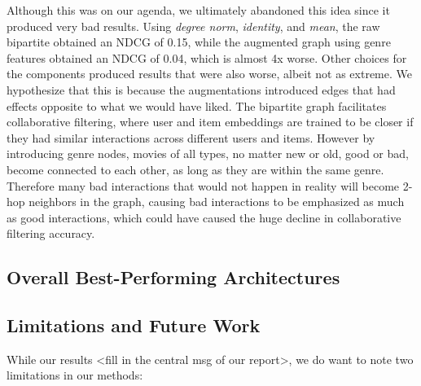 \documentclass{article}
\begin{document}
Although this was on our agenda, we ultimately abandoned this idea since it produced very bad results. Using \textit{degree norm}, \textit{identity}, and \textit{mean}, the raw bipartite obtained an NDCG of 0.15, while the augmented graph using genre features obtained an NDCG of 0.04, which is almost 4x worse. Other choices for the components produced results that were also worse, albeit not as extreme. We hypothesize that this is because the augmentations introduced edges that had effects opposite to what we would have liked. The bipartite graph facilitates collaborative filtering, where user and item embeddings are trained to be closer if they had similar interactions across different users and items. However by introducing genre nodes, movies of all types, no matter new or old, good or bad, become connected to each other, as long as they are within the same genre. Therefore many bad interactions that would not happen in reality will become 2-hop neighbors in the graph, causing bad interactions to be emphasized as much as good interactions, which could have caused the huge decline in collaborative filtering accuracy.

\subsection{Overall Best-Performing Architectures}


\subsection{Limitations and Future Work}


While our results <fill in the central msg of our report>, we do want to note two limitations in our methods:
\end{document}
